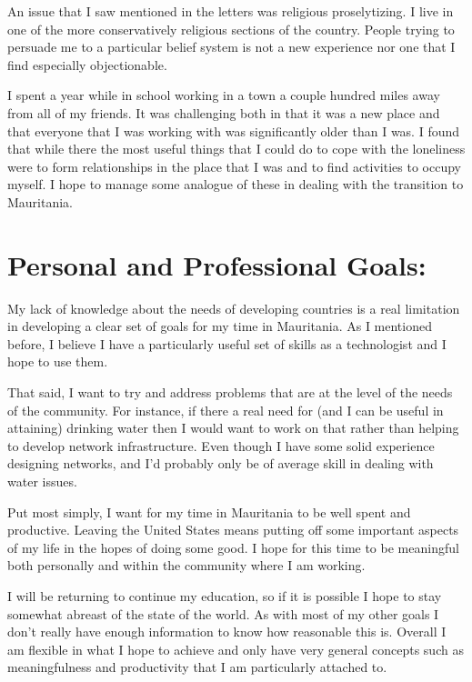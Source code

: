\documentclass[12pt,a4paper,twoside]{article}  %
\begin{document}
An issue that I saw mentioned in the letters was religious
proselytizing. I live in one of the more conservatively religious
sections of the country. People trying to persuade me to a particular
belief system is not a new experience nor one that I find especially
objectionable.

I spent a year while in school working in a town a couple hundred
miles away from all of my friends. It was challenging both in that it
was a new place and that everyone that I was working with was
significantly older than I was. I found that while there the most
useful things that I could do to cope with the loneliness were to form
relationships in the place that I was and to find activities to occupy
myself. I hope to manage some analogue of these in dealing with the
transition to Mauritania.

\section{Personal and Professional Goals:}

My lack of knowledge about the needs of developing countries is a real
limitation in developing a clear set of goals for my time in
Mauritania. As I mentioned before, I believe I have a particularly
useful set of skills as a technologist and I hope to use them.

That said, I want to try and address problems that are at the level of
the needs of the community. For instance, if there a real need for
(and I can be useful in attaining) drinking water then I would want to
work on that rather than helping to develop network
infrastructure. Even though I have some solid experience designing
networks, and I'd probably only be of average skill in dealing with
water issues.

Put most simply, I want for my time in Mauritania to be well spent and
productive. Leaving the United States means putting off some important
aspects of my life in the hopes of doing some good. I hope for this
time to be meaningful both personally and within the community where I
am working.

I will be returning to continue my education, so if it is possible I
hope to stay somewhat abreast of the state of the world. As with most
of my other goals I don't really have enough information to know how
reasonable this is. Overall I am flexible in what I hope to achieve
and only have very general concepts such as meaningfulness and
productivity that I am particularly attached to.
\end{document}
